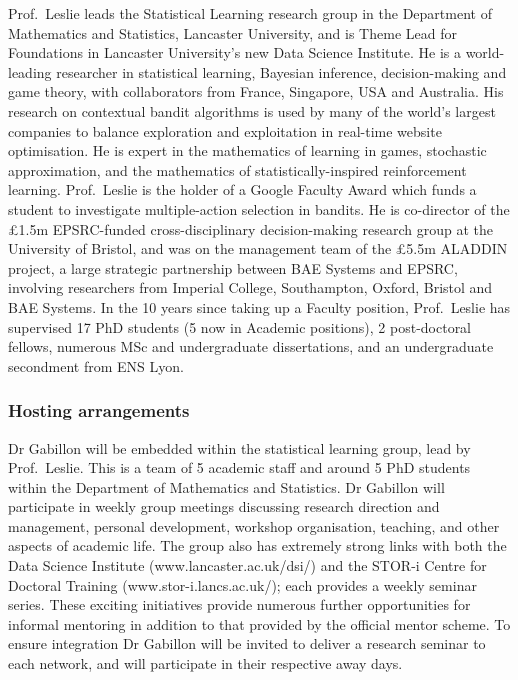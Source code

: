 \documentclass[a4paper,11pt]{article}
\renewcommand{\cite}{\autocite} %
\begin{document}
Prof.\ Leslie leads the Statistical Learning research group in the Department of Mathematics and Statistics, Lancaster University, and is Theme Lead for Foundations in Lancaster University's new Data Science Institute.  He is a world-leading researcher in statistical learning, Bayesian inference, decision-making and game theory, with collaborators from France, Singapore, USA and Australia.  His research on contextual bandit algorithms \cite{MayEtAl2012} is used by many of the world's largest companies to balance exploration and exploitation in real-time website optimisation.  He is expert in the mathematics of learning in games, stochastic approximation, and the mathematics of statistically-inspired reinforcement learning. \cite{LeslieCollins03,LeslieCollins05,LeslieCollins06,LarsenEtAl2010,PerkinsLeslie2012,ChapmanEtAl2013,PerkinsLeslie2014}  Prof.\ Leslie is the holder of a Google Faculty Award which funds a student to investigate multiple-action selection in bandits.  
He  is co-director of the \pounds1.5m EPSRC-funded cross-disciplinary decision-making research group at the University of Bristol, and was on the management team of the \pounds5.5m ALADDIN project, a large strategic partnership between BAE Systems and EPSRC, involving researchers from Imperial College, Southampton, Oxford, Bristol and BAE Systems.
 In the 10 years since taking up a Faculty position, Prof.\ Leslie has supervised 17 PhD students (5 now in Academic positions), 2 post-doctoral fellows, numerous MSc and undergraduate dissertations, and an undergraduate secondment from ENS Lyon.

\subsubsection*{Hosting arrangements}

Dr Gabillon will be embedded within the statistical learning group, lead by Prof.\ Leslie.  This is a team of 5 academic staff and around 5 PhD students within the Department of Mathematics and Statistics.  Dr Gabillon will participate in weekly group meetings discussing research direction and management, personal development, workshop organisation, teaching, and other aspects of academic life.  The group also has extremely strong links with both the Data Science Institute (www.lancaster.ac.uk/dsi/) and the STOR-i Centre for Doctoral Training (www.stor-i.lancs.ac.uk/); each provides a weekly seminar series.  These exciting initiatives provide numerous further opportunities for informal mentoring in addition to that provided by the official mentor scheme.  To ensure integration Dr Gabillon will be invited to deliver a research seminar to each network, and will participate in their respective away days.
\end{document}
